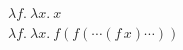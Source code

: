\documentclass{article}
\begin{document}
\begin{center}
	{\Large
		$\lambda f.\ \lambda x.\ x$\\[0.6em]
		$\lambda f.\ \lambda x.\ f(f(\cdots(f\, x)\cdots))$
	}
\end{center}
\end{document}
